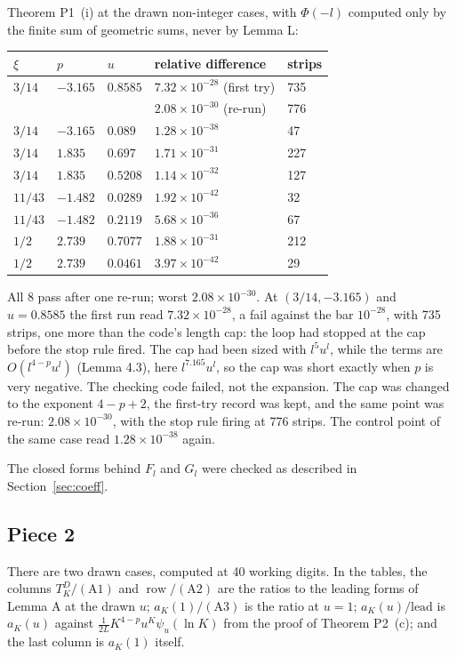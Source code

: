 \documentclass[11pt]{article}
\newcommand{\row}{\operatorname{row}}
\begin{document}
Theorem P1~(i) at the drawn non-integer cases, with $\Phi(-l)$ computed only by the finite sum of geometric sums, never by Lemma L:
\begin{center}
\begin{tabular}{lllll}
$\xi$ & $p$ & $u$ & relative difference & strips\\
\hline
$3/14$ & $-3.165$ & $0.8585$ & $7.32\times10^{-28}$ (first try) & 735\\
 & & & $2.08\times10^{-30}$ (re-run) & 776\\
$3/14$ & $-3.165$ & $0.089$ & $1.28\times10^{-38}$ & 47\\
$3/14$ & $1.835$ & $0.697$ & $1.71\times10^{-31}$ & 227\\
$3/14$ & $1.835$ & $0.5208$ & $1.14\times10^{-32}$ & 127\\
$11/43$ & $-1.482$ & $0.0289$ & $1.92\times10^{-42}$ & 32\\
$11/43$ & $-1.482$ & $0.2119$ & $5.68\times10^{-36}$ & 67\\
$1/2$ & $2.739$ & $0.7077$ & $1.88\times10^{-31}$ & 212\\
$1/2$ & $2.739$ & $0.0461$ & $3.97\times10^{-42}$ & 29\\
\end{tabular}
\end{center}
All 8 pass after one re-run; worst $2.08\times10^{-30}$. At $(3/14,-3.165)$ and $u=0.8585$ the first run read $7.32\times10^{-28}$, a fail against the bar $10^{-28}$, with 735 strips, one more than the code's length cap: the loop had stopped at the cap before the stop rule fired. The cap had been sized with $l^5u^l$, while the terms are $O(l^{4-p}u^l)$ (Lemma 4.3), here $l^{7.165}u^l$, so the cap was short exactly when $p$ is very negative. The checking code failed, not the expansion. The cap was changed to the exponent $4-p+2$, the first-try record was kept, and the same point was re-run: $2.08\times10^{-30}$, with the stop rule firing at 776 strips. The control point of the same case read $1.28\times10^{-38}$ again.

The closed forms behind $F_l$ and $G_l$ were checked as described in Section~\ref{sec:coeff}.

\subsection{Piece 2}

There are two drawn cases, computed at 40 working digits. In the tables, the columns $T^D_K/(\mathrm{A1})$ and $\row/(\mathrm{A2})$ are the ratios to the leading forms of Lemma A at the drawn $u$; $a_K(1)/(\mathrm{A3})$ is the ratio at $u=1$; $a_K(u)/\mathrm{lead}$ is $a_K(u)$ against $\frac{1}{2L}K^{4-p}u^K\psi_u(\ln K)$ from the proof of Theorem P2~(c); and the last column is $a_K(1)$ itself.
\end{document}
